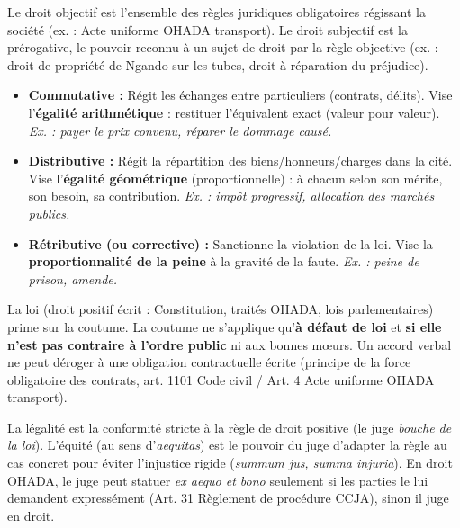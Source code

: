 \documentclass[11pt]{article}
\newcommand{\cle}[1]{{\popxbold\color{popdark}#1}}
\newcounter{popsec}
\newcounter{popsub}
\newcommand{\courssub}[1]{%
  \stepcounter{popsub}%
  \par\vspace{9pt}\noindent{\popxbold\fontsize{11.5}{13}\selectfont\color{popink}{\color{poporange}\thepopsec.\thepopsub}\hspace{6pt}#1}\par\nopagebreak\vspace{4pt}
}
\begin{document}
\courssub{Ressources à mobiliser}
\begin{definition}
Le \cle{droit objectif} est l'ensemble des règles juridiques obligatoires régissant la société (ex. : Acte uniforme OHADA transport). Le \cle{droit subjectif} est la prérogative, le pouvoir reconnu à un sujet de droit par la règle objective (ex. : droit de propriété de Ngando sur les tubes, droit à réparation du préjudice).
\end{definition}

\begin{definition}
\begin{itemize}
    \item \textbf{Commutative :} Régit les échanges entre particuliers (contrats, délits). Vise l'\textbf{égalité arithmétique} : restituer l'équivalent exact (valeur pour valeur). \textit{Ex. : payer le prix convenu, réparer le dommage causé.}
    \item \textbf{Distributive :} Régit la répartition des biens/honneurs/charges dans la cité. Vise l'\textbf{égalité géométrique} (proportionnelle) : à chacun selon son mérite, son besoin, sa contribution. \textit{Ex. : impôt progressif, allocation des marchés publics.}
    \item \textbf{Rétributive (ou corrective) :} Sanctionne la violation de la loi. Vise la \textbf{proportionnalité de la peine} à la gravité de la faute. \textit{Ex. : peine de prison, amende.}
\end{itemize}
\end{definition}

\begin{propriete}
La \cle{loi} (droit positif écrit : Constitution, traités OHADA, lois parlementaires) prime sur la \cle{coutume}. La coutume ne s'applique qu'\textbf{à défaut de loi} et \textbf{si elle n'est pas contraire à l'ordre public} ni aux bonnes mœurs. Un accord verbal ne peut déroger à une obligation contractuelle écrite (principe de la force obligatoire des contrats, art. 1101 Code civil / Art. 4 Acte uniforme OHADA transport).
\end{propriete}

\begin{aretenir}
La \cle{légalité} est la conformité stricte à la règle de droit positive (le juge \textit{bouche de la loi}). L'\cle{équité} (au sens d'\textit{aequitas}) est le pouvoir du juge d'adapter la règle au cas concret pour éviter l'injustice rigide (\textit{summum jus, summa injuria}). En droit OHADA, le juge peut statuer \textit{ex aequo et bono} seulement si les parties le lui demandent expressément (Art. 31 Règlement de procédure CCJA), sinon il juge en droit.
\end{aretenir}
\end{document}
